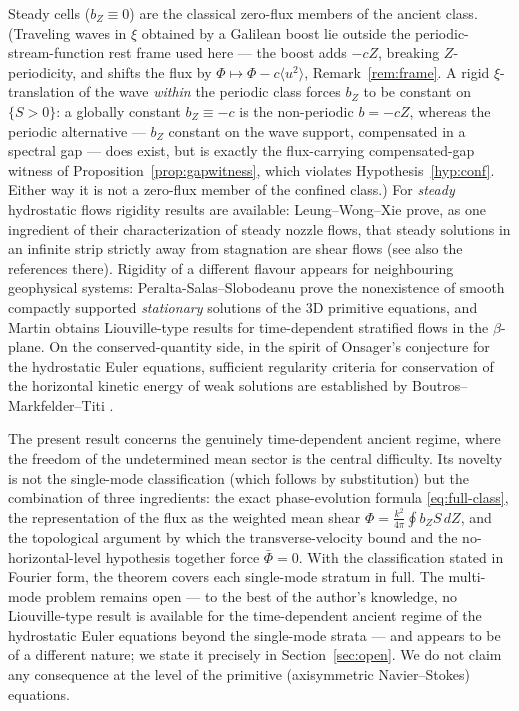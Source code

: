 \documentclass[11pt]{amsart}
\theoremstyle{definition}
\theoremstyle{remark}
\newcommand{\Fbar}{\bar\Phi}
\newcommand{\mean}[1]{\langle #1\rangle}
\begin{document}
Steady cells ($b_Z\equiv0$) are the classical zero-flux members of the
ancient class. (Traveling waves in $\xi$ obtained by a Galilean boost lie
outside the periodic-stream-function rest frame used here --- the boost
adds $-cZ$, breaking $Z$-periodicity, and shifts the flux by
$\Phi\mapsto\Phi-c\mean{u^2}$, Remark~\ref{rem:frame}. A rigid
$\xi$-translation of the wave \emph{within} the periodic class forces
$b_Z$ to be constant on $\{S>0\}$: a globally constant $b_Z\equiv-c$ is
the non-periodic $b=-cZ$, whereas the periodic alternative --- $b_Z$
constant on the wave support, compensated in a spectral gap --- does
exist, but is exactly the flux-carrying compensated-gap witness of
Proposition~\ref{prop:gapwitness}, which violates
Hypothesis~\ref{hyp:conf}. Either way it is not a zero-flux member of the
confined class.) For \emph{steady} hydrostatic
flows rigidity results are available: Leung--Wong--Xie \cite{LWX2024}
prove, as one ingredient of their characterization of steady nozzle
flows, that steady solutions in an infinite strip strictly away from
stagnation are shear flows (see also the references there). Rigidity of a
different flavour appears for neighbouring geophysical systems:
Peralta-Salas--Slobodeanu \cite{PeraltaSlobodeanu2023} prove the
nonexistence of smooth compactly supported \emph{stationary} solutions of
the $3$D primitive equations, and Martin \cite{Martin2023} obtains
Liouville-type results for time-dependent stratified flows in the
$\beta$-plane. On the conserved-quantity side, in the spirit of Onsager's conjecture
for the hydrostatic Euler equations, sufficient regularity criteria for
conservation of the horizontal kinetic energy of weak solutions are
established by Boutros--Markfelder--Titi \cite{BMTOnsager2023}.

The present result concerns the genuinely time-dependent ancient regime,
where the freedom of the undetermined mean sector is the central
difficulty. Its novelty is not the single-mode classification (which
follows by substitution) but the combination of three ingredients: the
exact phase-evolution formula \eqref{eq:full-class}, the representation of
the flux as the weighted mean shear
$\Phi=\tfrac{k^2}{4\pi}\oint b_Z S\,dZ$, and the topological argument by
which the transverse-velocity bound and the no-horizontal-level
hypothesis together force $\Fbar=0$. With the classification stated in
Fourier form, the theorem covers each single-mode stratum in full. The
multi-mode problem remains open --- to the best of the author's
knowledge, no Liouville-type result is available for the time-dependent
ancient regime of the hydrostatic Euler equations beyond the single-mode
strata --- and appears to be of a different nature; we state it precisely
in Section~\ref{sec:open}. We do not claim any consequence at the level
of the primitive (axisymmetric Navier--Stokes) equations.
\end{document}
